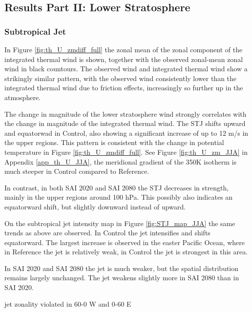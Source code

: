 \subsection{Results Part II: Lower Stratosphere}\label{lowerstrat}

\subsubsection{Subtropical Jet}
In Figure \ref{fig:th_U_zmdiff_full} the zonal mean of the zonal component of the integrated thermal wind is shown, together with the observed zonal-mean zonal wind in black countours. The observed wind and integrated thermal wind show a strikingly similar pattern, with the observed wind consistently lower than the integrated thermal wind due to friction effects, increasingly so further up in the atmosphere. 

The change in magnitude of the lower stratosphere wind strongly correlates with the change in magnitude of the integrated thermal wind. The STJ shifts upward and equatorwad in Control, also showing a significant increase of up to 12 m/s in the upper regions. This pattern is consistent with the change in potential temperature in Figure \ref{fig:th_U_zmdiff_full}. See Figure \ref{fig:th_U_zm_JJA} in Appendix \ref{app_th_U_JJA}, the meridional gradient of the 350K isotherm is much steeper in Control compared to Reference.

In contrast, in both SAI 2020 and SAI 2080 the STJ decreases in strength, mainly in the upper regions around 100 hPa. This possibly also indicates an equatorward shift, but slightly downward instead of upward. 

On the subtropical jet intensity map in Figure \ref{fig:STJ_map_JJA} the same trends as above are observed. In Control the jet intensifies and shifts equatorward. The largest increase is observed in the easter Pacific Ocean, where in Reference the jet is relatively weak, in Control the jet is strongest in this area.

In SAI 2020 and SAI 2080 the jet is much weaker, but the spatial distribution remains largely unchanged. The jet weakens slightly more in SAI 2080 than in SAI 2020. 

jet zonality violated in 60-0 W and 0-60 E \parencite{zolotov2018variability}


